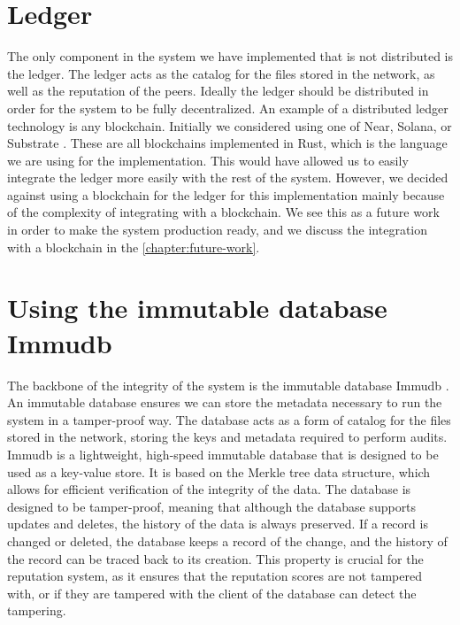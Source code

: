 \section{Ledger}

The only component in the system we have implemented that is not distributed is the ledger.
The ledger acts as the catalog for the files stored in the network,
as well as the reputation of the peers.
Ideally the ledger should be distributed in order for the system to be fully decentralized.
An example of a distributed ledger technology is any blockchain.
Initially we considered using one of Near, Solana, or Substrate \cite{near, solana, substrate}.
These are all blockchains implemented in Rust, which is the language we are using for the implementation.
This would have allowed us to easily integrate the ledger more easily with the rest of the system.
However, we decided against using a blockchain for the ledger for this implementation
mainly because of the complexity of integrating with a blockchain.
We see this as a future work in order to make the system production ready,
and we discuss the integration with a blockchain in the \autoref{chapter:future-work}.

\section{Using the immutable database Immudb}
\label{section:using-immudb}

The backbone of the integrity of the system is the immutable database Immudb \cite{immudb}.
An immutable database ensures we can store the metadata necessary to run the system
in a tamper-proof way.
The database acts as a form of catalog for the files stored in the network,
storing the keys and metadata required to perform audits.
Immudb is a lightweight, high-speed immutable database that is designed to be used as a key-value store.
It is based on the Merkle tree data structure, which allows for efficient verification of the integrity of the data.
The database is designed to be tamper-proof, meaning that although the database supports updates and deletes,
the history of the data is always preserved.
If a record is changed or deleted,
the database keeps a record of the change, and the history of the record can be traced back to its creation.
This property is crucial for the reputation system, as it ensures that the reputation scores are not tampered with,
or if they are tampered with the client of the database can detect the tampering.

